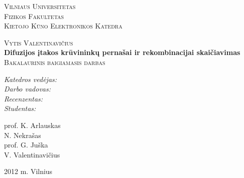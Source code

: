 \begin{titlepage}

\begin{center}



\textsc{\LARGE Vilniaus Universitetas} \\[0.1cm]
\textsc{\LARGE Fizikos Fakultetas} \\[0.1cm]
\textsc{\LARGE Kietojo Kūno Elektronikos Katedra}\\

\vfill

\textsc{\Large Vytis Valentinavičius}\\[1.5cm]




{ \huge \bfseries Difuzijos įtakos krūvininkų pernašai ir rekombinacijai skaičiavimas}\\[1cm]

\textsc{\Large Bakalaurinis baigiamasis darbas}\\


\vfill

\begin{minipage}{0.4\textwidth}
\begin{flushleft} \large
\emph{Katedros vedėjas:} \\
\emph{Darbo vadovas:} \\
\emph{Recenzentas:} \\
\emph{Studentas:} \\
\end{flushleft}
\end{minipage}
\begin{minipage}{0.4\textwidth}
\begin{flushright} \large
prof. K. Arlauskas \\
N. Nekrašas \\
prof. G. Juška\\
V. Valentinavičius \\
\end{flushright}
\end{minipage}

\vspace{3cm}

{\large 2012 m. Vilnius}

\end{center}

\end{titlepage}